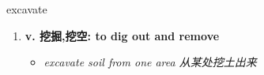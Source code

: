 
\begin{frame}
{\huge excavate}
\begin{center}
\begin{enumerate}\Large
  \item \textbf{v. 挖掘,挖空: to dig out and remove}
  \begin{itemize}
    \item \em{\Large{excavate soil from one area 从某处挖土出来}}
  \end{itemize}
\end{enumerate}
\end{center}
\end{frame}
